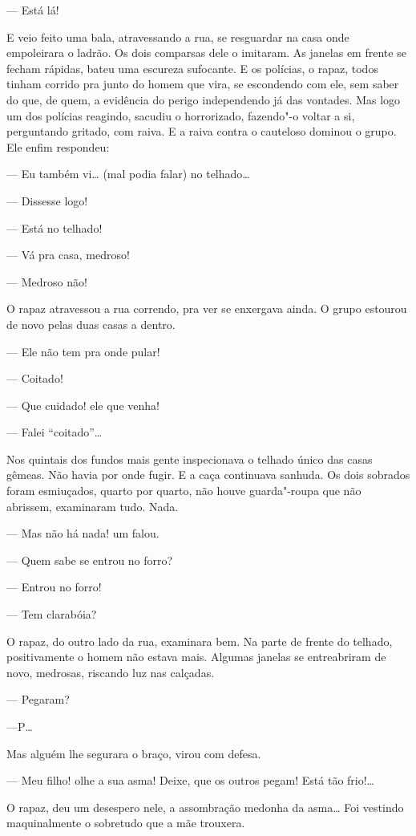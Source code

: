 --- Está lá!

E veio feito uma bala, atravessando a rua, se resguardar na casa onde
empoleirara o ladrão. Os dois comparsas dele o imitaram. As janelas em
frente se fecham rápidas, bateu uma escureza sufocante. E os polícias, o
rapaz, todos tinham corrido pra junto do homem que vira, se escondendo
com ele, sem saber do que, de quem, a evidência do perigo independendo
já das vontades. Mas logo um dos polícias reagindo, sacudiu o
horrorizado, fazendo"-o voltar a si, perguntando gritado, com raiva. E a
raiva contra o cauteloso dominou o grupo. Ele enfim respondeu:

--- Eu também vi\ldots{} (mal podia falar) no telhado\ldots{}

--- Dissesse logo!

--- Está no telhado!

--- Vá pra casa, medroso!

--- Medroso não!

O rapaz atravessou a rua correndo, pra ver se enxergava ainda. O grupo
estourou de novo pelas duas casas a dentro.

--- Ele não tem pra onde pular!

--- Coitado!

--- Que cuidado! ele que venha!

--- Falei ``coitado''\ldots{}

Nos quintais dos fundos mais gente inspecionava o telhado único das
casas gêmeas. Não havia por onde fugir. E a caça continuava sanhuda. Os
dois sobrados foram esmiuçados, quarto por quarto, não houve
guarda"-roupa que não abrissem, examinaram tudo. Nada.

--- Mas não há nada! um falou.

--- Quem sabe se entrou no forro?

--- Entrou no forro!

--- Tem clarabóia?

O rapaz, do outro lado da rua, examinara bem. Na parte de frente do
telhado, positivamente o homem não estava mais. Algumas janelas se
entreabriram de novo, medrosas, riscando luz nas calçadas.

--- Pegaram?

---P\ldots{}

Mas alguém lhe segurara o braço, virou com defesa.

--- Meu filho! olhe a sua asma! Deixe, que os outros pegam! Está tão
frio!\ldots{}

O rapaz, deu um desespero nele, a assombração medonha da asma\ldots{} Foi
vestindo maquinalmente o sobretudo que a mãe trouxera.

